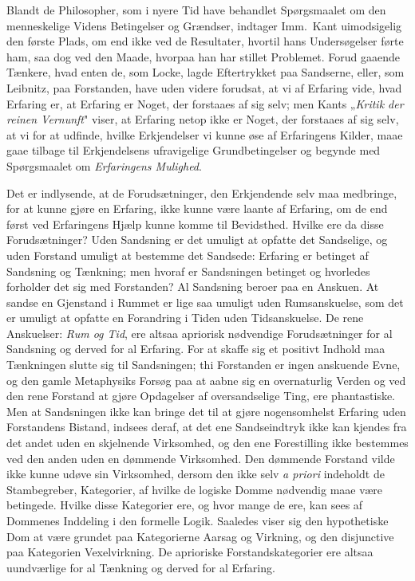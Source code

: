 \documentclass[12pt]{article}
\newcommand{\opage}[1]{\marginnote{\footnotesize\textit{[#1]}}}
\begin{document}
\noindent
Blandt de Philosopher, som i nyere Tid have behandlet
Spørgsmaalet om den menneskelige Videns Betingelser og
Grændser, indtager Imm.\ Kant uimodsigelig den første Plads,
om end ikke ved de Resultater, hvortil hans Undersøgelser
\opage{5} førte ham, saa dog ved den Maade, hvorpaa han har stillet
Problemet. Forud gaaende Tænkere, hvad enten de, som Locke,
lagde Eftertrykket paa Sandserne, eller, som Leibnitz, paa
Forstanden, have uden videre forudsat, at vi af Erfaring vide,
hvad Erfaring er, at Erfaring er Noget, der forstaaes af sig
selv; men Kants „\emph{Kritik der reinen Vernunft}" viser, at
Erfaring netop ikke er Noget, der forstaaes af sig selv, at vi
for at udfinde, hvilke Erkjendelser vi kunne øse af Erfaringens
Kilder, maae gaae tilbage til Erkjendelsens ufravigelige
Grundbetingelser og begynde med Spørgsmaalet om
\emph{Erfaringens Mulighed}.

Det er indlysende, at de Forudsætninger, den Erkjendende
selv maa medbringe, for at kunne gjøre en Erfaring, ikke
kunne være laante af Erfaring, om de end først ved Erfaringens
Hjælp kunne komme til Bevidsthed. Hvilke ere da disse
Forudsætninger? Uden Sandsning er det umuligt at opfatte det
Sandselige, og uden Forstand umuligt at bestemme det Sandsede:
Erfaring er betinget af Sandsning og Tænkning; men hvoraf
er Sandsningen betinget og hvorledes forholder det sig med
Forstanden? Al Sandsning beroer paa en Anskuen. At sandse
en Gjenstand i Rummet er lige saa umuligt uden Rumsanskuelse,
som det er umuligt at opfatte en Forandring i Tiden uden
Tidsanskuelse. De rene Anskuelser: \emph{Rum og Tid}, ere altsaa
apriorisk nødvendige Forudsætninger for al Sandsning og derved
for al Erfaring. For at skaffe sig et positivt Indhold maa
Tænkningen slutte sig til Sandsningen; thi Forstanden er ingen
anskuende Evne, og den gamle Metaphysiks Forsøg paa at
aabne sig en overnaturlig Verden og ved den rene Forstand at
gjøre Opdagelser af oversandselige Ting, ere phantastiske. Men
at Sandsningen ikke kan bringe det til at gjøre nogensomhelst
Erfaring uden Forstandens Bistand, indsees deraf, at det ene
Sandseindtryk ikke kan kjendes fra det andet uden en skjel\-nende
Virksomhed, og den ene Forestilling ikke bestemmes ved
den anden uden en dømmende Virksomhed. Den dømmende
Forstand vilde ikke kunne udøve sin Virksomhed, dersom den
ikke selv \textit{a priori} indeholdt de Stambegreber, Kategorier, af
hvilke de logiske Domme nødvendig maae være betingede.
\opage{6} Hvilke disse Kategorier ere, og hvor mange de ere, kan sees
af Dommenes Inddeling i den formelle Logik. Saaledes viser
sig den hypothetiske Dom at være grundet paa Kategorierne
Aarsag og Virkning, og den disjunctive paa Kategorien
Vexelvirkning. De aprioriske Forstandskategorier ere altsaa
uundværlige for al Tænkning og derved for al Erfaring.
\end{document}

